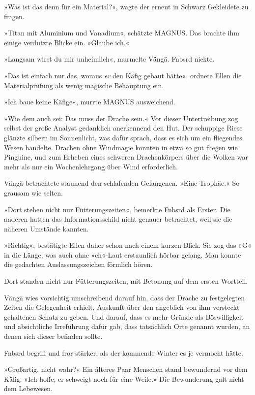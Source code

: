 »Was ist das denn für ein Material?«, wagte der erneut in Schwarz Gekleidete zu fragen.

»Titan mit Aluminium und Vanadium«, schätzte MAGNUS. Das brachte ihm einige verdutzte Blicke ein. »Glaube ich.«

»Langsam wirst du mir unheimlich«, murmelte Vängä. Fnbsrd nickte.

»Das ist einfach nur das, woraus \emph{er} den Käfig gebaut hätte«, ordnete Ellen die Materialprüfung als wenig magische Behauptung ein.

»Ich baue keine Käfige«, murrte MAGNUS ausweichend.

»Wie dem auch sei: Das muss der Drache sein.« Vor dieser Untertreibung zog selbst der große Analyst gedanklich anerkennend den Hut. Der schuppige Riese glänzte silbern im Sonnenlicht, was dafür sprach, dass es sich um ein fliegendes Wesen handelte. Drachen ohne Windmagie konnten in etwa so gut fliegen wie Pinguine, und zum Erheben eines schweren Drachenkörpers über die Wolken war mehr als nur ein Wochenlehrgang über Wind erforderlich.

Vängä betrachtete staunend den schlafenden Gefangenen. »Eine Trophäe.« So grausam wie selten.

»Dort stehen nicht nur Fütterungszeiten«, bemerkte Fnbsrd als Erster. Die anderen hatten das Informationsschild nicht genauer betrachtet, weil sie die näheren Umstände kannten.

»Richtig«, bestätigte Ellen daher schon nach einem kurzen Blick. Sie zog das »G« in die Länge, was auch ohne »ch«-Laut erstaunlich hörbar gelang. Man konnte die gedachten Auslassungszeichen förmlich hören.

Dort standen nicht nur Fütterungszeiten, mit Betonung auf dem ersten Wortteil.

Vängä wies vorsichtig umschreibend darauf hin, dass der Drache zu festgelegten Zeiten die Gelegenheit erhielt, Auskunft über den angeblich von ihm versteckt gehaltenen Schatz zu geben. Und darauf, dass es mehr Gründe als Böswilligkeit und absichtliche Irreführung dafür gab, dass tatsächlich Orte genannt wurden, an denen sich dieser befinden sollte.

 Fnbsrd begriff und fror stärker, als der kommende Winter es je vermocht hätte. 

»Großartig, nicht wahr?« Ein älteres Paar Menschen stand bewundernd vor dem Käfig. »Ich hoffe, er schweigt noch für eine Weile.« Die Bewunderung galt nicht dem Lebewesen.

